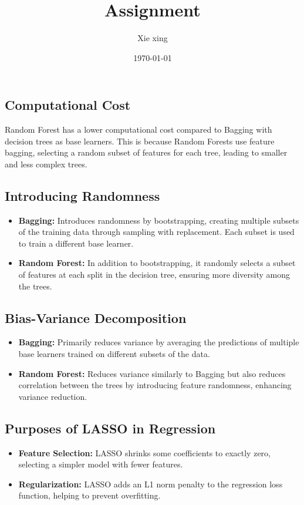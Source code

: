 \documentclass[oneside,solution]{seu-ml-assign}
\title{Assignment}
\author{Xie xing}
\date{\today}
\begin{document}
\maketitle



\subsection{Computational Cost}

Random Forest has a lower computational cost compared to Bagging with decision trees as base learners. This is because Random Forests use feature bagging, selecting a random subset of features for each tree, leading to smaller and less complex trees.

\subsection{Introducing Randomness}
\begin{itemize}
    \item \textbf{Bagging:} Introduces randomness by bootstrapping, creating multiple subsets of the training data through sampling with replacement. Each subset is used to train a different base learner.
    \item \textbf{Random Forest:} In addition to bootstrapping, it randomly selects a subset of features at each split in the decision tree, ensuring more diversity among the trees.
\end{itemize}

\subsection{Bias-Variance Decomposition}
\begin{itemize}
    \item \textbf{Bagging:} Primarily reduces variance by averaging the predictions of multiple base learners trained on different subsets of the data.
    \item \textbf{Random Forest:} Reduces variance similarly to Bagging but also reduces correlation between the trees by introducing feature randomness, enhancing variance reduction.
\end{itemize}

\subsection{Purposes of LASSO in Regression}
\begin{itemize}
    \item \textbf{Feature Selection:} LASSO shrinks some coefficients to exactly zero, selecting a simpler model with fewer features.
    \item \textbf{Regularization:} LASSO adds an L1 norm penalty to the regression loss function, helping to prevent overfitting.
\end{itemize}
\end{document}
